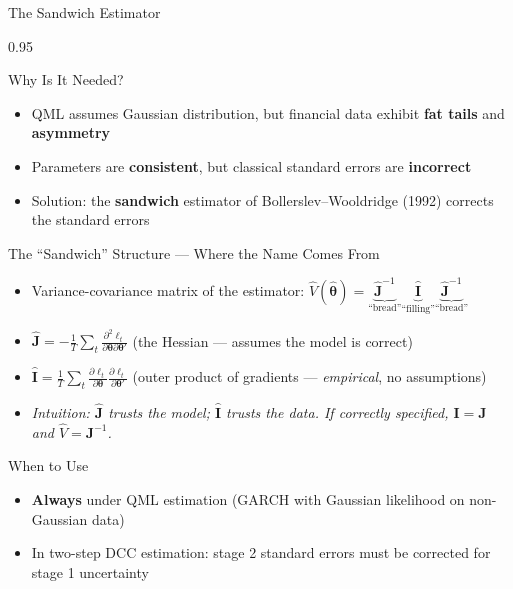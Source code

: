 \documentclass[9pt, aspectratio=169, t]{beamer}
\begin{document}
\begin{frame}{The Sandwich Estimator}
    \begin{cminipage}{0.95\textwidth}
    \vspace{-3mm}
    {\scriptsize
    \begin{block}{Why Is It Needed?}
        \begin{itemize}\setlength{\itemsep}{0pt}
            \item QML assumes Gaussian distribution, but financial data exhibit \textbf{fat tails} and \textbf{asymmetry}
            \item Parameters are \textbf{consistent}, but classical standard errors are \textbf{incorrect}
            \item Solution: the \textbf{sandwich} estimator of Bollerslev--Wooldridge (1992) corrects the standard errors
        \end{itemize}
    \end{block}
    \vspace{-2mm}
    \begin{block}{The ``Sandwich'' Structure --- Where the Name Comes From}
        \begin{itemize}\setlength{\itemsep}{0pt}
            \item Variance-covariance matrix of the estimator: $\hat{V}(\hat{\boldsymbol{\theta}}) = \underbrace{\hat{\mathbf{J}}^{-1}}_{\text{``bread''}} \underbrace{\hat{\mathbf{I}}}_{\text{``filling''}} \underbrace{\hat{\mathbf{J}}^{-1}}_{\text{``bread''}}$
            \item $\hat{\mathbf{J}} = -\frac{1}{T}\sum_t \frac{\partial^2 \ell_t}{\partial \boldsymbol{\theta}\partial \boldsymbol{\theta}'}$ \quad (the Hessian --- assumes the model is correct)
            \item $\hat{\mathbf{I}} = \frac{1}{T}\sum_t \frac{\partial \ell_t}{\partial \boldsymbol{\theta}} \frac{\partial \ell_t}{\partial \boldsymbol{\theta}'}$ \quad (outer product of gradients --- \textit{empirical}, no assumptions)
            \item \textit{Intuition: $\hat{\mathbf{J}}$ trusts the model; $\hat{\mathbf{I}}$ trusts the data. If correctly specified, $\mathbf{I} = \mathbf{J}$ and $\hat{V} = \mathbf{J}^{-1}$.}
        \end{itemize}
    \end{block}
    \vspace{-2mm}
    \begin{alertblock}{When to Use}
        \begin{itemize}\setlength{\itemsep}{0pt}
            \item \textbf{Always} under QML estimation (GARCH with Gaussian likelihood on non-Gaussian data)
            \item In two-step DCC estimation: stage 2 standard errors must be corrected for stage 1 uncertainty
        \end{itemize}
    \end{alertblock}
    }
    \end{cminipage}
\end{frame}
\end{document}
